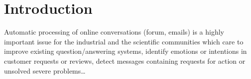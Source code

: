 
\section{Introduction}
\label{sec:intro}

Automatic processing of online conversations (forum, emails) 
is a highly important issue for the industrial and the scientific communities which care to improve existing question/answering systems, identify emotions or intentions in customer requests or reviews, detect messages containing requests for action or unsolved severe problems\ldots
%
%
%
%
%
%

